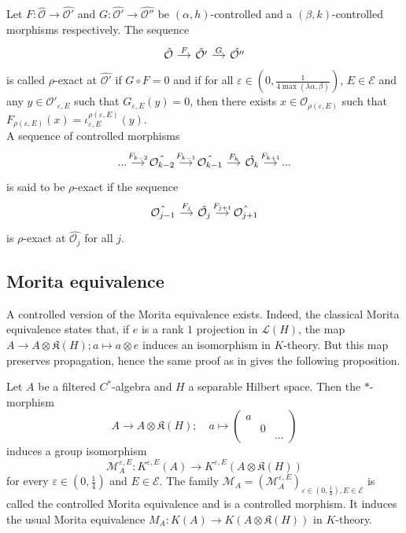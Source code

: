 \begin{definition}
Let $F : \hat{\mathcal O}\rightarrow \hat{\mathcal O'}$ and $G : \hat{\mathcal O'}\rightarrow \hat{\mathcal O''}$ be $(\alpha,h)$-controlled and a $(\beta,k)$-controlled morphisms respectively. The sequence
\[\begin{tikzcd}[column sep = small] \hat{\mathcal O} \arrow{r}{F} & \hat{\mathcal O'} \arrow{r}{G} & \hat{\mathcal O''} \end{tikzcd}\]
is called $\rho$-exact at $\hat{\mathcal O'}$ if $G\circ F=0$ and if for all $\varepsilon\in (0,\frac{1}{4 \max (\lambda \alpha,\beta)})$, $E\in\mathcal E$ and any $y\in \mathcal O'_{\varepsilon,E}$ such that $G_{\varepsilon,E}(y) = 0$, then there exists $x\in \mathcal O_{\rho(\varepsilon,E)}$ such that $F_{\rho(\varepsilon,E)}(x)=\iota_{\varepsilon,E}^{\rho(\varepsilon,E)} (y)$.\\
A sequence of controlled morphisms 
\[\begin{tikzcd}[column sep = small] ... \arrow{r}{F_{k-2}} & \hat{\mathcal O_{k-2}} \arrow{r}{F_{k-1}} & \hat{\mathcal O_{k-1}} \arrow{r}{F_k} & \hat{\mathcal O_k} \arrow{r}{F_{k+1}} & ... \end{tikzcd}\] 
is said to be $\rho$-exact if the sequence
\[\begin{tikzcd}[column sep = small] \hat{\mathcal O_{j-1}} \arrow{r}{F_{j}} & \hat{\mathcal O_{j}} \arrow{r}{F_{j+1}} & \hat{\mathcal O_{j+1}} \end{tikzcd}\]
is $\rho$-exact at $\hat{\mathcal O_j}$ for all $j$.
\end{definition}

\subsection{Morita equivalence}
A controlled version of the Morita equivalence exists. Indeed, the classical Morita equivalence states that, if $e$ is a rank $1$ projection in $\mathcal L (H)$, the map $A\rightarrow A\otimes \mathfrak K(H) ; a\mapsto a\otimes e$ induces an isomorphism in $K$-theory. But this map preserves propagation, hence the same proof as in \cite{OY2} gives the following proposition.

\begin{prop}
Let $A$ be a filtered $C^*$-algebra and $H$ a separable Hilbert space. Then the $*$-morphism
\[A\rightarrow A\otimes \mathfrak K(H) ; \quad a\mapsto 
\begin{pmatrix}a & & \\  & 0 & \\ & & ... \end{pmatrix}\]
induces a group isomorphism 
\[\mathcal M_A^{\varepsilon,E} : K^{\varepsilon,E}(A)\rightarrow K^{\varepsilon,E}(A\otimes \mathfrak K(H)) \]
for every $\varepsilon\in(0,\frac{1}{4})$ and $E\in\mathcal E$. The family $\mathcal M_A = (\mathcal M_A^{\varepsilon,E} )_{\varepsilon\in(0,\frac{1}{4}),E\in\mathcal E}$ is called the controlled Morita equivalence and is a controlled morphism. It induces the usual Morita equivalence $M_A: K(A)\rightarrow K(A\otimes \mathfrak K(H))$ in $K$-theory. 
\end{prop}

